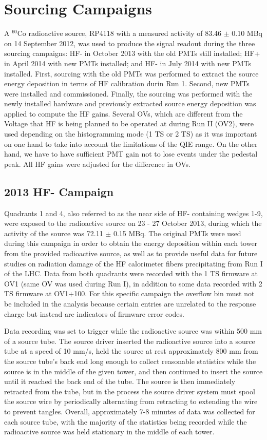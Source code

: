 \section{Sourcing Campaigns}
A $^{60}$Co radioactive source, RP4118 with a measured activity of 83.46 $\pm$
0.10 MBq on 14 September 2012, was used to produce the signal readout
during the three sourcing campaigns: HF- in October 2013 with the old PMTs still
installed; HF+ in April 2014 with new PMTs installed; and HF- in July 2014 with
new PMTs installed. First, sourcing with the old PMTs was performed to extract
the source energy deposition in terms of HF calibration durin Run 1. Second, new PMTs were installed and commissioned. Finally, the sourcing was performed with the newly installed hardware and previously extracted source energy deposition was applied to compute the HF gains. Several OVs, which are different from the Voltage that HF is being planned to be operated at during Run II (OV2), were used depending on the histogramming mode (1 TS or 2 TS) as it was important on one hand to take into account the limitations of the QIE range. On the other hand, we have to have sufficient PMT gain not to lose events under the pedestal peak. All HF gains were adjusted for the difference in OVs.

\subsection{2013 HF- Campaign}
Quadrants 1 and 4, also referred to as the near side of HF- containing wedges
1-9, were exposed to the radioactive source on 23 - 27 October 2013, during
which the activity of the source was 72.11 $\pm$ 0.15 MBq. The original
PMTs were used during this campaign in order to obtain the energy deposition
within each tower from the provided radioactive source, as well as to provide
useful data for future studies on radiation damage of the HF calorimeter fibers
precipitating from Run I of the LHC. Data from both quadrants were recorded
with the 1 TS firmware at OV1 (same OV was used during Run I), in
addition to some data recorded with 2 TS firmware at OV1+100. For this
specific campaign the overflow bin must not be included in the analysis
because certain entries are unrelated to the response charge but instead are
indicators of firmware error codes.

Data recording was set to trigger while the radioactive source was within 500 mm
of a source tube. The source driver inserted the radioactive source into a source
tube at a speed of 10 mm/s, held the source at rest approximately 800 mm
from the source tube's back end long enough to collect reasonable statistics
while the source is in the middle of the given tower, and then continued to
insert the source until it reached the back end of the tube. The source is then
immediately retracted from the tube, but in the process the source driver system
must spool the source wire by periodically alternating from retracting to extending the wire to prevent tangles. Overall, approximately 7-8 minutes of data was collected for each source tube, with the majority of the statistics being recorded while the radioactive source was held stationary in the middle of each tower.

